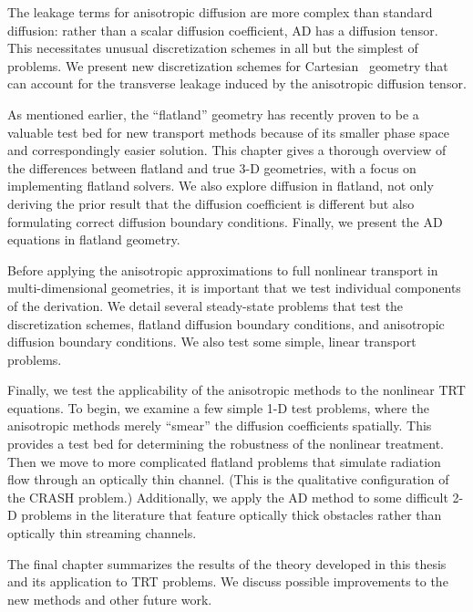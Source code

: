 The leakage terms for anisotropic diffusion are more complex than standard
diffusion: rather than a scalar diffusion coefficient, AD has a diffusion
tensor. This necessitates unusual discretization schemes in all but the simplest
of problems. We present new discretization schemes for Cartesian \xy\ geometry
that can account for the transverse leakage induced by the anisotropic diffusion
tensor.

As mentioned earlier, the ``flatland'' geometry has recently proven to be a
valuable test bed for new transport methods because of its smaller phase space
and correspondingly easier solution. This chapter gives a thorough overview of
the differences between flatland and true 3-D geometries, with a focus on
implementing flatland solvers. We also explore diffusion in flatland, not only
deriving the prior result that the diffusion coefficient is different but also
formulating correct diffusion boundary conditions. Finally, we present the AD
equations in flatland geometry.

Before applying the anisotropic approximations to full nonlinear transport in
multi-dimensional geometries, it is important that we test individual components
of the derivation. We detail several steady-state problems that test the
discretization schemes, flatland diffusion boundary conditions, and anisotropic
diffusion boundary conditions. We also test some simple, linear transport
problems.

Finally, we test the applicability of the anisotropic methods to the nonlinear
TRT equations. To begin, we examine a few simple 1-D test problems, where the
anisotropic methods merely ``smear'' the diffusion coefficients spatially.
This provides a test bed for determining the robustness of the nonlinear
treatment. Then
we move to more complicated flatland problems that simulate radiation flow
through an optically thin channel. (This is the qualitative configuration of
the CRASH problem.)
Additionally, we apply the AD method to some difficult 2-D problems in the
literature that feature optically thick obstacles rather than optically thin
streaming channels.

The final chapter summarizes the results of the theory developed in this thesis
and its application to TRT problems. We discuss possible improvements to the new
methods and other future work.

